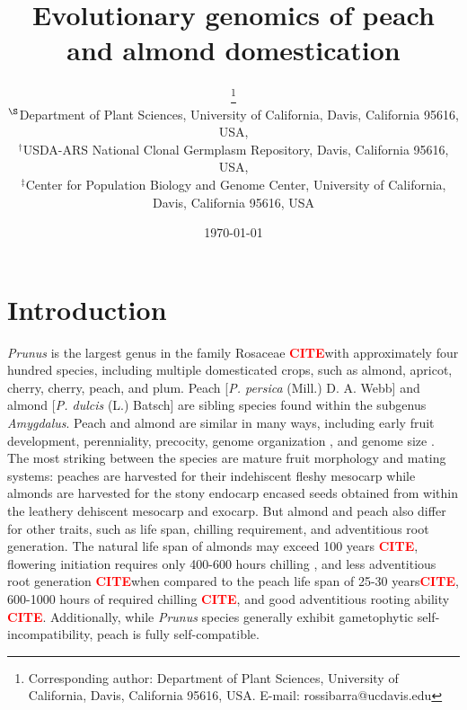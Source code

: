 \documentclass[12pt]{article}
\newcommand{\citex}{\textcolor{red}{\bf CITE}}
\begin{document}
\title{Evolutionary genomics of peach \\and almond domestication}

\author{\small{}\thanks{Corresponding author: Department of Plant Sciences, University of California, Davis, California 95616, USA. E-mail: \mbox{rossibarra@ucdavis.edu}} \\[0.3cm]
     \small\sf $^{\S}$Department of Plant Sciences, University of California, Davis, California 95616, USA,\\
     \small\sf $^{\dag}$USDA-ARS National Clonal Germplasm Repository, Davis, California 95616, USA,\\
     \small\sf $^{\ddag}$Center for Population Biology and Genome Center, University of California, Davis, California 95616, USA}

\date{\today}
\section*{Introduction}
%
\emph{Prunus} is the largest genus in the family Rosaceae \citex with approximately four hundred species, including multiple domesticated crops, such as almond, apricot, cherry, cherry, peach, and plum.
%
Peach [\emph{P. persica} (Mill.) D. A. Webb] and almond [\emph{P. dulcis} (L.) Batsch] are sibling species found within the subgenus \emph{Amygdalus}.
%
Peach and almond are similar in many ways, including early fruit development, perenniality, precocity, genome organization \citep{arus2012peach}, and genome size \citep{baird1994estimating}. 
%
The most striking between the species are mature fruit morphology and mating systems: peaches are harvested for their indehiscent fleshy mesocarp while almonds are harvested for the stony endocarp encased seeds obtained from within the leathery dehiscent mesocarp and exocarp. 
%
But almond and peach also differ for other traits, such as life span, chilling requirement, and adventitious root generation.
%
The natural life span of almonds may exceed 100 years \citex,
flowering initiation requires only 400-600 hours chilling \citep{alonso2005determination}, 
and less adventitious root generation \citex when compared to the peach life span of 25-30 years\citex, 
600-1000 hours of required chilling \citex, 
and good adventitious rooting ability \citex. 
%
Additionally, while \emph{Prunus} species generally exhibit gametophytic self-incompatibility, peach is fully self-compatible.
\end{document}
